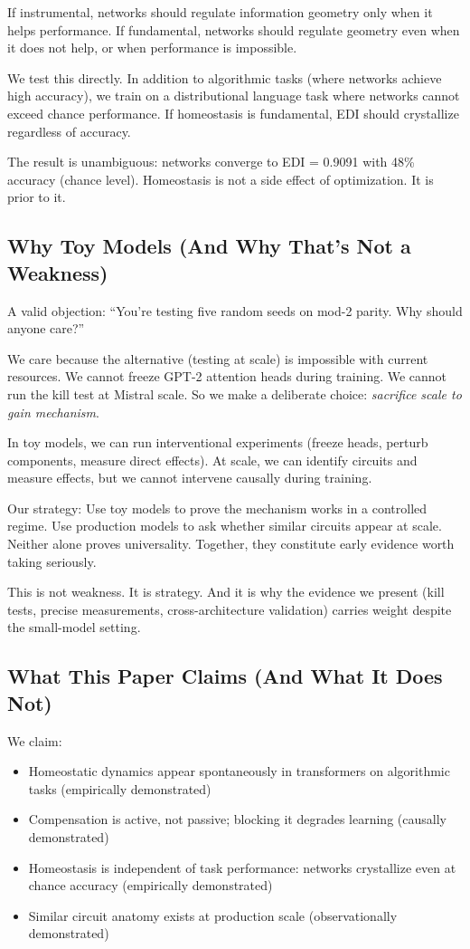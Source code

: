 If instrumental, networks should regulate information geometry only when it helps performance. If fundamental, networks should regulate geometry even when it does not help, or when performance is impossible.

We test this directly. In addition to algorithmic tasks (where networks achieve high accuracy), we train on a distributional language task where networks cannot exceed chance performance. If homeostasis is fundamental, EDI should crystallize regardless of accuracy.

The result is unambiguous: networks converge to EDI = 0.9091 with 48\% accuracy (chance level). Homeostasis is not a side effect of optimization. It is prior to it.



\subsection{Why Toy Models (And Why That's Not a Weakness)}

A valid objection: ``You're testing five random seeds on mod-2 parity. Why should anyone care?''

We care because the alternative (testing at scale) is impossible with current resources. We cannot freeze GPT-2 attention heads during training. We cannot run the kill test at Mistral scale. So we make a deliberate choice: \textit{sacrifice scale to gain mechanism}.

In toy models, we can run interventional experiments (freeze heads, perturb components, measure direct effects). At scale, we can identify circuits and measure effects, but we cannot intervene causally during training.

Our strategy: Use toy models to prove the mechanism works in a controlled regime. Use production models to ask whether similar circuits appear at scale. Neither alone proves universality. Together, they constitute early evidence worth taking seriously.

This is not weakness. It is strategy. And it is why the evidence we present (kill tests, precise measurements, cross-architecture validation) carries weight despite the small-model setting.

\subsection{What This Paper Claims (And What It Does Not)}

We claim:
\begin{itemize}
    \item Homeostatic dynamics appear spontaneously in transformers on algorithmic tasks (empirically demonstrated)
    \item Compensation is active, not passive; blocking it degrades learning (causally demonstrated)
    \item Homeostasis is independent of task performance: networks crystallize even at chance accuracy (empirically demonstrated)
    \item Similar circuit anatomy exists at production scale (observationally demonstrated)
\end{itemize}

